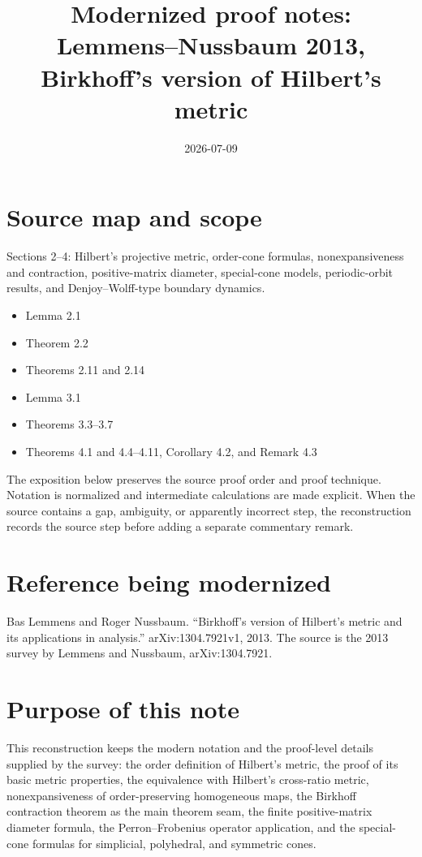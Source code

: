 \documentclass[11pt]{article}
\title{Modernized proof notes: Lemmens--Nussbaum 2013, Birkhoff's version of Hilbert's metric}
\author{}
\date{2026-07-09}
\begin{document}
\maketitle

\section*{Source map and scope}
\begin{description}[style=nextline,leftmargin=3.2cm,labelwidth=3cm]
\item[Primary source] \texttt{}
\item[Coverage] Sections 2--4: Hilbert's projective metric, order-cone formulas, nonexpansiveness and contraction, positive-matrix diameter, special-cone models, periodic-orbit results, and Denjoy--Wolff-type boundary dynamics.
\item[Source anchors]
\begin{itemize}[leftmargin=2em]
  \item Lemma 2.1
  \item Theorem 2.2
  \item Theorems 2.11 and 2.14
  \item Lemma 3.1
  \item Theorems 3.3--3.7
  \item Theorems 4.1 and 4.4--4.11, Corollary 4.2, and Remark 4.3
\end{itemize}
\end{description}

The exposition below preserves the source proof order and proof technique.  Notation is normalized
and intermediate calculations are made explicit.  When the source contains a gap, ambiguity, or
apparently incorrect step, the reconstruction records the source step before adding a separate
commentary remark.

\section*{Reference being modernized}
Bas Lemmens and Roger Nussbaum. ``Birkhoff's version of Hilbert's metric and its applications in analysis.'' arXiv:1304.7921v1, 2013.
The source is the 2013 survey by Lemmens and Nussbaum, arXiv:1304.7921.

\section*{Purpose of this note}
This reconstruction keeps the modern notation and the proof-level details supplied by the survey: the order definition of Hilbert's metric, the proof of its basic metric properties, the equivalence with Hilbert's cross-ratio metric, nonexpansiveness of order-preserving homogeneous maps, the Birkhoff contraction theorem as the main theorem seam, the finite positive-matrix diameter formula, the Perron--Frobenius operator application, and the special-cone formulas for simplicial, polyhedral, and symmetric cones.
\end{document}
